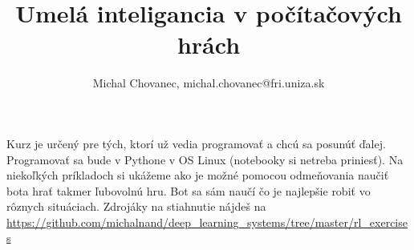 \documentclass[10pt,a5paper]{article}
\begin{document}
\title{Umelá inteligancia v počítačových hrách}
\author{Michal Chovanec,
michal.chovanec@fri.uniza.sk}
\date{}
\maketitle
\thispagestyle{empty}

Kurz je určený pre tých, ktorí už vedia programovať a chcú sa posunúť ďalej.
Programovať sa bude v Pythone v OS Linux (notebooky si netreba priniesť).
Na niekoľkých príkladoch si ukážeme ako je možné pomocou odmeňovania naučiť bota
hrať takmer ľubovolnú hru. Bot sa sám naučí čo je najlepšie robiť vo rôznych situáciach.
Zdrojáky na stiahnutie nájdeš na \url{https://github.com/michalnand/deep\_learning\_systems/tree/master/rl\_exercises}
\\
\\
\end{document}
